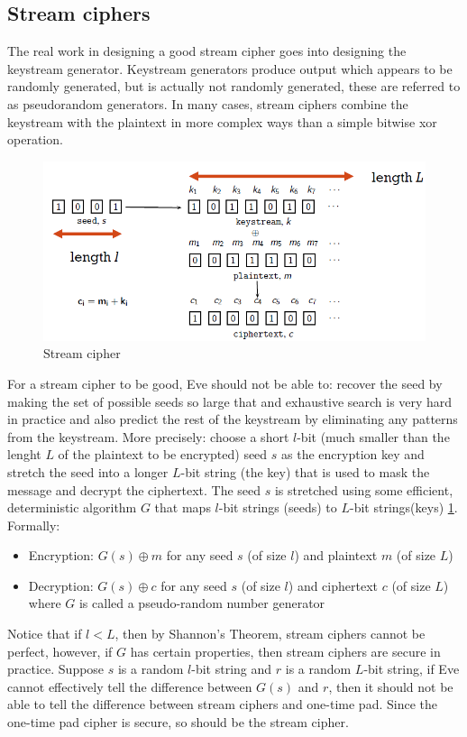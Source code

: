 \subsection{Stream ciphers}
The real work in designing a good stream cipher goes into designing the keystream generator. Keystream generators produce output which appears to be randomly generated, but is actually not randomly generated, these are referred to as pseudorandom generators. In many cases, stream ciphers combine the keystream with the plaintext in more complex ways than a simple bitwise xor operation.

\begin{figure}
	\centering
	\includegraphics[width=0.7\linewidth]{Images/Chapter2/stream_ciphers}
	\caption{Stream cipher}
	\label{fig:stream_ciphers}
\end{figure}


For a stream cipher to be good, Eve should not be able to: recover the seed by making the set of possible seeds so large that and exhaustive search is very hard in practice and also predict the rest of the keystream by eliminating any patterns from the keystream.
More precisely: choose a short $l$-bit (much smaller than the lenght $L$ of the plaintext to be encrypted) seed $s$ as the encryption key and stretch the seed into a longer $L$-bit string (the key) that is used to mask the message and decrypt the ciphertext. The seed $s$ is stretched using some efficient, deterministic algorithm $G$ that maps $l$-bit strings (seeds) to $L$-bit strings(keys) \ref{fig:stream_ciphers}. Formally:
\begin{itemize}
	\item Encryption: $G(s) \oplus m$ for any seed $s$ (of size $l$) and plaintext $m$ (of size $L$)
	\item Decryption: $G(s) \oplus c$ for any seed $s$ (of size $l$) and ciphertext $c$ (of size $L$) where $G$ is called a pseudo-random number generator
\end{itemize}

Notice that if $l<L$, then by Shannon’s Theorem, stream ciphers cannot be perfect, however, if $G$ has certain properties, then stream ciphers are secure in practice. Suppose $s$ is a random $l$-bit string and $r$ is a random $L$-bit string, if Eve cannot effectively tell the difference between $G(s)$ and $r$, then it should not be able to tell the difference between stream ciphers and one-time pad. Since the one-time pad cipher is secure, so should be the stream cipher.

